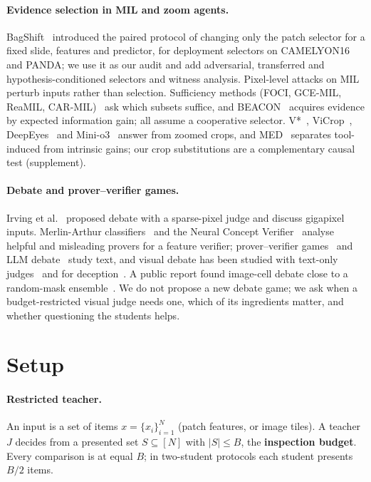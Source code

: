 \documentclass[10pt,twocolumn,letterpaper]{article}
\begin{document}
\paragraph{Evidence selection in MIL and zoom agents.} BagShift~\cite{bagshift2026} introduced the paired protocol of changing only the patch selector for a fixed slide, features and predictor, for deployment selectors on CAMELYON16 and PANDA; we use it as our audit and add adversarial, transferred and hypothesis-conditioned selectors and witness analysis. Pixel-level attacks on MIL~\cite{mil_adv2022,foote2021now} perturb inputs rather than selection. Sufficiency methods (FOCI, GCE-MIL, ReaMIL, CAR-MIL)~\cite{foci2026,gcemil2026,reamil2026,carmil2026} ask which subsets suffice, and BEACON~\cite{beacon2026} acquires evidence by expected information gain; all assume a cooperative selector. V*~\cite{wu2024vstar}, ViCrop~\cite{zhang2025vicrop}, DeepEyes~\cite{zheng2025deepeyes} and Mini-o3~\cite{minio3} answer from zoomed crops, and MED~\cite{med2026} separates tool-induced from intrinsic gains; our crop substitutions are a complementary causal test (supplement).
\paragraph{Debate and prover--verifier games.} Irving et al.~\cite{irving2018debate} proposed debate with a sparse-pixel judge and discuss gigapixel inputs. Merlin-Arthur classifiers~\cite{waldchen2024merlin} and the Neural Concept Verifier~\cite{ncv2026} analyse helpful and misleading provers for a feature verifier; prover--verifier games~\cite{anil2021pvg,kirchner2024pvg,hammond2025nip} and LLM debate~\cite{khan2024debate,kenton2024scalable} study text, and visual debate has been studied with text-only judges~\cite{adhikari2025debating} and for deception~\cite{fang2026debateimages}. A public report found image-cell debate close to a random-mask ensemble~\cite{quantilized_debate}. We do not propose a new debate game; we ask when a budget-restricted visual judge needs one, which of its ingredients matter, and whether questioning the students helps.

\section{Setup}\label{sec:setup}
\paragraph{Restricted teacher.} An input is a set of items $x=\{x_i\}_{i=1}^N$ (patch features, or image tiles). A teacher $J$ decides from a presented set $S\subseteq[N]$ with $|S|\le B$, the \textbf{inspection budget}. Every comparison is at equal $B$; in two-student protocols each student presents $B/2$ items.
\end{document}
